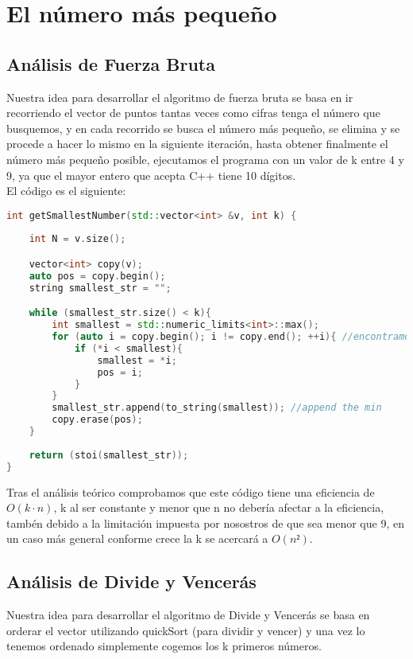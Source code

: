 \documentclass[a4paper,12pt]{article}
\begin{document}
\section{El número más pequeño}
\label{sec:El número más pequeño}
\subsection{Análisis de Fuerza Bruta}

Nuestra idea para desarrollar el algoritmo de fuerza bruta se basa en ir recorriendo el vector de 
puntos tantas veces como cifras tenga el número que busquemos, y en cada recorrido se busca el 
número más pequeño, se elimina y se procede a hacer lo mismo en la siguiente iteración, hasta obtener 
finalmente el número más pequeño posible, ejecutamos el programa con un valor de k entre 4 y 9, ya 
que el mayor entero que acepta C++ tiene 10 dígitos.\\

El código es el siguiente:

\begin{lstlisting}[language=C++, caption={Brute Force de \textbf{``El número más pequeño''}}]
int getSmallestNumber(std::vector<int> &v, int k) {
    
    int N = v.size();

    vector<int> copy(v);
    auto pos = copy.begin();
    string smallest_str = "";

    while (smallest_str.size() < k){
        int smallest = std::numeric_limits<int>::max();
        for (auto i = copy.begin(); i != copy.end(); ++i){ //encontramos minimo
            if (*i < smallest){
                smallest = *i;
                pos = i;
            }
        }
        smallest_str.append(to_string(smallest)); //append the min
        copy.erase(pos);
    }
    
    return (stoi(smallest_str));
}	
	 \end{lstlisting}

	 Tras el análisis teórico comprobamos que este código tiene una eficiencia de $O(k\cdot n)$, 
	 k al ser constante y menor que n no debería afectar a la eficiencia, tambén debido a la limitación 
	 impuesta por nosostros de que sea menor que 9, en un caso más general conforme crece la k se acercará a $O(n²)$.\\
	 
\subsection{Análisis de Divide y Vencerás}
Nuestra idea para desarrollar el algoritmo de Divide y Vencerás se basa en orderar el vector utilizando quickSort 
(para dividir y vencer) y una vez lo tenemos ordenado simplemente cogemos los k primeros números. \\
\end{document}
